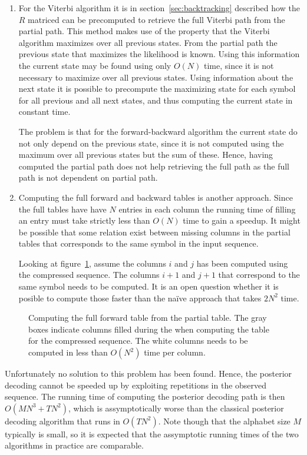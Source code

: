 \begin{enumerate}
\item For the Viterbi algorithm it is in section~\ref{sec:backtracking}
  described how the $R$ matriced can be precomputed to retrieve the full
  Viterbi path from the partial path. This method makes use of the property
  that the Viterbi algorithm maximizes over all previous states. From the
  partial path the previous state that maximizes the likelihood is known. Using
  this information the current state may be found using only $O(N)$ time, since
  it is not necessary to maximize over all previous states. Using information
  about the next state it is possible to precompute the maximizing state for
  each symbol for all previous and all next states, and thus computing the
  current state in constant time.

  The problem is that for the forward-backward algorithm the current state do
  not only depend on the previous state, since it is not computed using the
  maximum over all previous states but the sum of these. Hence, having computed
  the partial path does not help retrieving the full path as the full path is
  not dependent on partial path.
\item Computing the full forward and backward tables is another approach. Since
  the full tables have have $N$ entries in each column the running time of
  filling an entry must take strictly less than $O(N)$ time to gain a
  speedup. It might be possible that some relation exist between missing
  columns in the partial tables that corresponds to the same symbol in the
  input sequence.

  Looking at figure~\ref{fig:full-forward-table}, assume the columns $i$ and
  $j$ has been computed using the compressed sequence. The columns $i + 1$ and
  $j + 1$  that correspond to the same symbol needs to be computed. It is an
  open question whether it is posible to compute those faster than the naïve
  approach that takes $2N^2$ time.
\end{enumerate}

\begin{figure}
  \centering
  
  \caption{Computing the full forward table from the partial table. The gray
    boxes indicate columns filled during the when computing the table for the
    compressed sequence. The white columns needs to be computed in less than
    $O(N^2)$ time per column.}
  \label{fig:full-forward-table}
\end{figure}

Unfortunately no solution to this problem has been found. Hence, the posterior
decoding cannot be speeded up by exploiting repetitions in the observed
sequence. The running time of computing the posterior decoding path is then
$O(M N^3 + TN^2)$, which is assymptotically worse than the classical posterior
decoding algorithm that runs in $O(TN^2)$. Note though that the alphabet size
$M$ typically is small, so it is expected that the assymptotic running times of
the two algorithms in practice are comparable.

